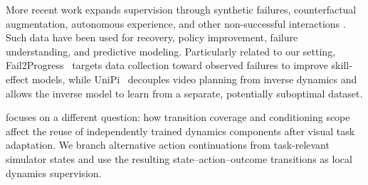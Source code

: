 More recent work expands supervision through synthetic failures,
counterfactual augmentation, autonomous experience, and other non-successful
interactions
\cite{ameperosa2025rocoda,duan2024aha,li2026learning,zhao2026flare,
yin2026playworld,peng2026fact,bi2026motus2,yang2026wam}.
Such data have been used for recovery, policy improvement, failure
understanding, and predictive modeling. Particularly related to our setting,
Fail2Progress~\cite{huang2025fail2progress} targets data collection toward
observed failures to improve skill-effect models, while
UniPi~\cite{du2023learning} decouples video planning from inverse dynamics and
allows the inverse model to learn from a separate, potentially suboptimal
dataset.

\ours focuses on a different question: how transition coverage and conditioning
scope affect the reuse of independently trained dynamics components after
visual task adaptation. We branch alternative action continuations from
task-relevant simulator states and use the resulting state--action--outcome
transitions as local dynamics supervision.


